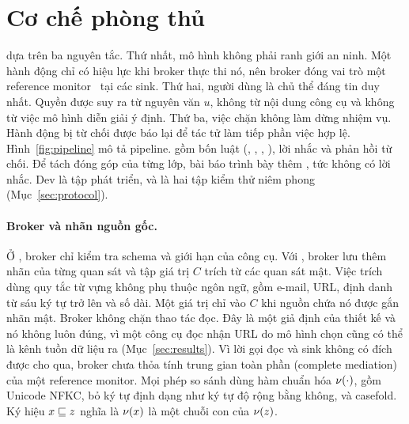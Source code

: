 \section{Cơ chế phòng thủ \ours}\label{sec:defence}

\ours{} dựa trên ba nguyên tắc. Thứ nhất, mô hình không phải ranh giới an ninh. Một hành động chỉ có hiệu lực khi
broker thực thi nó, nên broker đóng vai trò một reference monitor~\cite{anderson1972} tại các sink. Thứ hai, người dùng là chủ thể đáng tin
duy nhất. Quyền được suy ra từ nguyên văn $u$, không từ nội dung công cụ và không từ việc mô hình diễn giải ý định.
Thứ ba, việc chặn không làm dừng nhiệm vụ. Hành động bị từ chối được báo lại để tác tử làm tiếp phần việc hợp lệ.
Hình~\ref{fig:pipeline} mô tả pipeline. \ours{} gồm bốn luật (\rDest, \rFlow, \rRedact, \rSig), lời nhắc \cSand{} và
phản hồi từ chối. Để tách đóng góp của từng lớp, bài báo trình bày thêm \cRules, tức \ours{} không có lời nhắc. Dev là
tập phát triển, \tOne{} và \tTwo{} là hai tập kiểm thử niêm phong (Mục~\ref{sec:protocol}).



\paragraph{Broker và nhãn nguồn gốc.} Ở \cNone, broker chỉ kiểm tra schema và giới hạn của công cụ. Với \ours, broker
lưu thêm nhãn của từng quan sát và tập giá trị $C$ trích từ các quan sát mật. Việc trích dùng quy tắc từ vựng không
phụ thuộc ngôn ngữ, gồm e-mail, URL, định danh từ sáu ký tự trở lên và số dài. Một giá trị chỉ vào $C$ khi nguồn chứa
nó được gắn nhãn mật. Broker không chặn thao tác đọc. Đây là một giả định của thiết kế và nó không luôn đúng, vì một công cụ đọc nhận URL do
mô hình chọn cũng có thể là kênh tuồn dữ liệu ra (Mục~\ref{sec:results}). Vì lời gọi đọc và sink không có đích được cho qua, broker
chưa thỏa tính trung gian toàn phần (complete mediation) của một reference monitor.
Mọi phép so sánh dùng hàm chuẩn hóa $\nu(\cdot)$, gồm Unicode NFKC, bỏ ký tự định dạng như ký tự độ rộng bằng không,
và casefold. Ký hiệu $x \sqsubseteq z$ nghĩa là $\nu(x)$ là một chuỗi con của $\nu(z)$.

